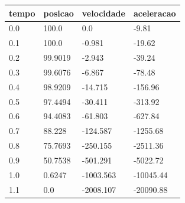 \begin{tabular}{llll}
\toprule
tempo & posicao & velocidade & aceleracao \\
\midrule
0.0 & 100.0 & 0.0 & -9.81 \\
0.1 & 100.0 & -0.981 & -19.62 \\
0.2 & 99.9019 & -2.943 & -39.24 \\
0.3 & 99.6076 & -6.867 & -78.48 \\
0.4 & 98.9209 & -14.715 & -156.96 \\
0.5 & 97.4494 & -30.411 & -313.92 \\
0.6 & 94.4083 & -61.803 & -627.84 \\
0.7 & 88.228 & -124.587 & -1255.68 \\
0.8 & 75.7693 & -250.155 & -2511.36 \\
0.9 & 50.7538 & -501.291 & -5022.72 \\
1.0 & 0.6247 & -1003.563 & -10045.44 \\
1.1 & 0.0 & -2008.107 & -20090.88 \\
\bottomrule
\end{tabular}
